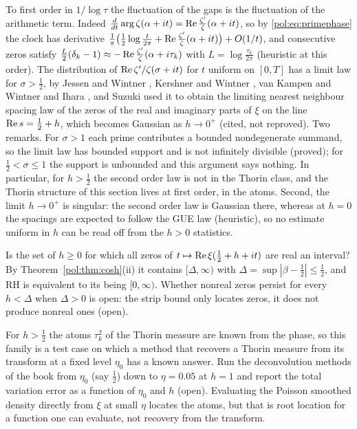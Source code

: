 \begin{remark}\label{pol:rem:wintner}
To first order in $1/\log\tau$ the fluctuation of the gaps is the fluctuation of the arithmetic term. Indeed $\frac{d}{dt}\arg\zeta(\alpha+it)=\operatorname{Re}\frac{\zeta'}\zeta(\alpha+it)$, so by \eqref{pol:eq:primephase} the clock has derivative $\frac1\pi\big(\frac12\log\frac t{2\pi}+\operatorname{Re}\frac{\zeta'}\zeta(\alpha+it)\big)+O(1/t)$, and consecutive zeros satisfy $\frac L2(\delta_k-1)\approx-\operatorname{Re}\frac{\zeta'}\zeta(\alpha+i\tau_k)$ with $L=\log\frac{\tau_k}{2\pi}$ (heuristic at this order). The distribution of $\operatorname{Re}\zeta'/\zeta(\sigma+it)$ for $t$ uniform on $[0,T]$ has a limit law for $\sigma>\frac12$, by Jessen and Wintner \cite{JessenWintner35}, Kershner and Wintner \cite{KershnerWintner37}, van Kampen and Wintner \cite{vanKampenWintner37} and Ihara \cite{Ihara08}, and Suzuki \cite{Suzuki15} used it to obtain the limiting nearest neighbour spacing law of the zeros of the real and imaginary parts of $\xi$ on the line $\operatorname{Re} s=\frac12+h$, which becomes Gaussian as $h\to0^+$ (cited, not reproved). Two remarks. For $\sigma>1$ each prime contributes a bounded nondegenerate summand, so the limit law has bounded support and is not infinitely divisible (proved); for $\frac12<\sigma\le1$ the support is unbounded and this argument says nothing. In particular, for $h>\frac12$ the second order law is not in the Thorin class, and the Thorin structure of this section lives at first order, in the atoms. Second, the limit $h\to0^+$ is singular: the second order law is Gaussian there, whereas at $h=0$ the spacings are expected to follow the GUE law (heuristic), so no estimate uniform in $h$ can be read off from the $h>0$ statistics.
\end{remark}

\begin{problem}[Monotonicity in $h$]\label{pol:prob:mono}
Is the set of $h\ge0$ for which all zeros of $t\mapsto\operatorname{Re}\xi(\frac12+h+it)$ are real an interval? By Theorem~\ref{pol:thm:cosh}(ii) it contains $[\Delta,\infty)$ with $\Delta=\sup|\beta-\frac12|\le\frac12$, and RH is equivalent to its being $[0,\infty)$. Whether nonreal zeros persist for every $h<\Delta$ when $\Delta>0$ is open: the strip bound only locates zeros, it does not produce nonreal ones (open).
\end{problem}

\begin{problem}\label{pol:prob:calib}
For $h>\frac12$ the atoms $\tau_k^2$ of the Thorin measure are known from the phase, so this family is a test case on which a method that recovers a Thorin measure from its transform at a fixed level $\eta_0$ has a known answer. Run the deconvolution methods of the book from $\eta_0$ (say $\frac12$) down to $\eta=0.05$ at $h=1$ and report the total variation error as a function of $\eta_0$ and $h$ (open). Evaluating the Poisson smoothed density directly from $\xi$ at small $\eta$ locates the atoms, but that is root location for a function one can evaluate, not recovery from the transform.
\end{problem}

